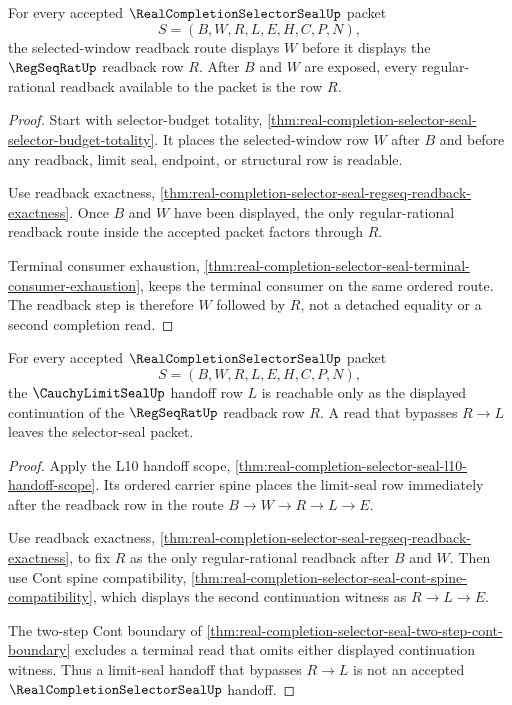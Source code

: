 \begin{theorem}
\label{thm:real-completion-selector-seal-selected-window-readback}
For every accepted $\RealCompletionSelectorSealUp$ packet
$$
S=(B,W,R,L,E,H,C,P,N),
$$
the selected-window readback route displays $W$ before it displays the $\RegSeqRatUp$ readback row $R$. After $B$ and $W$ are exposed, every regular-rational readback available to the packet is the row $R$.
\end{theorem}
\begin{proof}
Start with selector-budget totality, \autoref{thm:real-completion-selector-seal-selector-budget-totality}. It places the selected-window row $W$ after $B$ and before any readback, limit seal, endpoint, or structural row is readable.

Use readback exactness, \autoref{thm:real-completion-selector-seal-regseq-readback-exactness}. Once $B$ and $W$ have been displayed, the only regular-rational readback route inside the accepted packet factors through $R$.

Terminal consumer exhaustion, \autoref{thm:real-completion-selector-seal-terminal-consumer-exhaustion}, keeps the terminal consumer on the same ordered route. The readback step is therefore $W$ followed by $R$, not a detached equality or a second completion read.
\end{proof}

\begin{theorem}
\label{thm:real-completion-selector-seal-limit-seal-handoff}
For every accepted $\RealCompletionSelectorSealUp$ packet
$$
S=(B,W,R,L,E,H,C,P,N),
$$
the $\CauchyLimitSealUp$ handoff row $L$ is reachable only as the displayed continuation of the $\RegSeqRatUp$ readback row $R$. A read that bypasses $R \to L$ leaves the selector-seal packet.
\end{theorem}
\begin{proof}
Apply the L10 handoff scope, \autoref{thm:real-completion-selector-seal-l10-handoff-scope}. Its ordered carrier spine places the limit-seal row immediately after the readback row in the route $B \to W \to R \to L \to E$.

Use readback exactness, \autoref{thm:real-completion-selector-seal-regseq-readback-exactness}, to fix $R$ as the only regular-rational readback after $B$ and $W$. Then use Cont spine compatibility, \autoref{thm:real-completion-selector-seal-cont-spine-compatibility}, which displays the second continuation witness as $R \to L \to E$.

The two-step Cont boundary of \autoref{thm:real-completion-selector-seal-two-step-cont-boundary} excludes a terminal read that omits either displayed continuation witness. Thus a limit-seal handoff that bypasses $R \to L$ is not an accepted $\RealCompletionSelectorSealUp$ handoff.
\end{proof}

